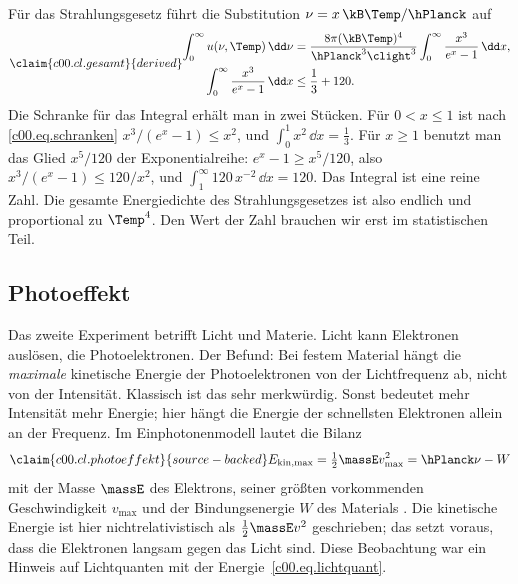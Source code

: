 \begin{vertiefung}
  Für das Strahlungsgesetz führt die Substitution $\nu = x\,\kB\Temp/\hPlanck$ auf
  \begin{equation}\label{c00.eq.gesamt}\claim{c00.cl.gesamt}{derived}
    \begin{aligned}
      \int_0^{\infty} u(\nu, \Temp)\,\dd\nu
      &= \frac{8\pi (\kB\Temp)^4}{\hPlanck^3 \clight^3} \int_0^\infty \frac{x^3}{e^x - 1}\,\dd x , \\
      \int_0^\infty \frac{x^3}{e^x - 1}\,\dd x &\leq \frac13 + 120 .
    \end{aligned}
  \end{equation}
  Die Schranke für das Integral erhält man in zwei Stücken. Für $0 < x \leq 1$ ist nach
  \eqref{c00.eq.schranken} $x^3/(e^x-1) \leq x^2$, und $\int_0^1 x^2\,\dd x = \tfrac13$.
  Für $x \geq 1$ benutzt man das Glied $x^5/120$ der Exponentialreihe:
  $e^x - 1 \geq x^5/120$, also $x^3/(e^x-1) \leq 120/x^2$, und
  $\int_1^\infty 120\,x^{-2}\,\dd x = 120$. Das Integral ist eine reine Zahl. Die gesamte
  Energiedichte des Strahlungsgesetzes ist also endlich und proportional zu $\Temp^4$.
  Den Wert der Zahl brauchen wir erst im statistischen Teil.
\end{vertiefung}

\subsection{Photoeffekt}\label{c00.s4.2}

Das zweite Experiment betrifft Licht und Materie. Licht kann Elektronen auslösen, die
Photoelektronen. Der Befund: Bei festem Material hängt die \emph{maximale} kinetische Energie
der Photoelektronen von der Lichtfrequenz ab, nicht von der Intensität. Klassisch ist das sehr
merkwürdig. Sonst bedeutet mehr Intensität mehr Energie; hier hängt die Energie der
schnellsten Elektronen allein an der Frequenz. Im Einphotonenmodell lautet die Bilanz
\begin{equation}\label{c00.eq.photoeffekt}\claim{c00.cl.photoeffekt}{source-backed}
  E_{\mathrm{kin,max}} = \tfrac12 \massE v_{\max}^2 = \hPlanck\nu - W
\end{equation}
mit der Masse $\massE$ des Elektrons, seiner größten vorkommenden Geschwindigkeit
$v_{\max}$ und der Bindungsenergie $W$ des Materials
. Die kinetische Energie ist hier
nichtrelativistisch als $\tfrac12 \massE v^2$ geschrieben; das setzt voraus, dass die
Elektronen langsam gegen das Licht sind. Diese Beobachtung war ein Hinweis auf Lichtquanten
mit der Energie~\eqref{c00.eq.lichtquant}.

